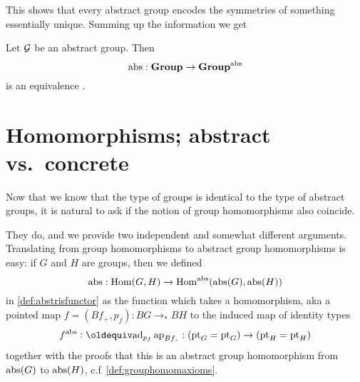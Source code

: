 This shows that every abstract group encodes the symmetries of something essentially unique.  Summing up the information we get
\begin{theorem}
  \label{lem:Groupsareidentitytypes}Let ${\mathcal G}$ be an abstract group.  
Then
$$\mathrm{abs}:\mathbf{Group}\to\mathbf{Group}^{\mathrm{abs}}$$ is an equivalence%
.
\end{theorem}

\section{Homomorphisms; abstract vs.~concrete}
\label{sec:homabsisconcr}

Now that we know that the type of groups is identical to the type of abstract groups, it is natural to ask if the notion of group homomorphisms also coincide.  

They do, and we provide two independent and somewhat different arguments.  Translating from group homomorphisms to abstract group homomorphisms is easy: if $G$ and $H$ are groups, then we defined 
$$\mathrm{abs}:\mathrm{Hom}(G,H)\to\mathrm{Hom}^{\mathrm{abs}}(\mathrm{abs}(G),\mathrm{abs}(H))$$
in \cref{def:abstrisfunctor} as the function which takes a homomorphism, aka a pointed map $f=(Bf_\div,p_f):BG\to_*BH$ to the induced map of identity types 
$$f^\abstr\defequi \mathrm{ad}_{p_f}\ap{Bf_\div}:(\pt_G=\pt_G)\to(\pt_H=\pt_H)$$
 together with the proofs that this is an abstract group homomorphism from $\mathrm{abs}(G)$ to $\mathrm{abs}(H)$, c.f~\cref{def:grouphomomaxioms}.



